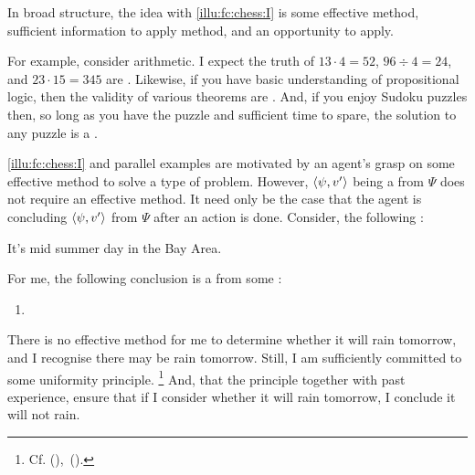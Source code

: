 \begin{note}
  In broad structure, the idea with \autoref{illu:fc:chess:I} is some effective method, sufficient information to apply method, and an opportunity to apply.

  For example, consider arithmetic.
  I expect the truth of \(13 \cdot 4 = 52\), \(96 \div 4 = 24\), and \(23 \cdot 15 = 345\) are .
  Likewise, if you have basic understanding of propositional logic, then the validity of various theorems are .
  And, if you enjoy Sudoku puzzles then, so long as you have the puzzle and sufficient time to spare, the solution to any puzzle is a \fc{}.
\end{note}

\begin{note}
  \autoref{illu:fc:chess:I} and parallel examples are motivated by an agent's grasp on some effective method to solve a type of problem.
  However, \(\langle \psi, v' \rangle\) being a \fc{} from \(\Psi\) does not require an effective method.
  It need only be the case that the agent is concluding \(\langle \psi, v' \rangle\) from \(\Psi\) after an action is done.
  Consider, the following :

  \begin{scenario}%
    \label{illu:fc:sunny}%
    It's mid summer day in the Bay Area.
  \end{scenario}

  \noindent For me, the following conclusion is a \fc{} from some \pool{}:

  \begin{enumerate}[label=C\thescenarioCounter., ref=(C\thescenarioCounter)]
  \item
    \label{illu:fc:sunny:c}
  \end{enumerate}

  \noindent%
  There is no effective method for me to determine whether it will rain tomorrow, and I recognise there may be rain tomorrow.
  Still, I am sufficiently committed to some uniformity principle.%
  \footnote{
    Cf. (\cite[70]{Hempel:1965aa}),~(\cite{Henderson:2022aa}).
  }
  And, that the principle together with past experience, ensure that if I consider whether it will rain tomorrow, I conclude it will not rain.%
\end{note}

